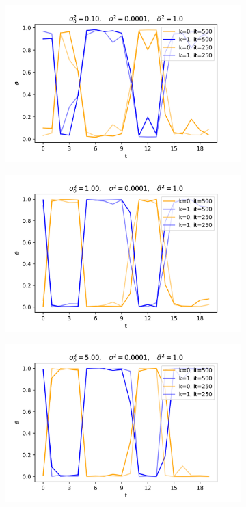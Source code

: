 \documentclass[12pt]{article}
\begin{document}
\begin{figure}[H]
  \begin{subfigure}[b]{0.33\textwidth}
    \includegraphics[width=\linewidth]{init_1E-01|basic_1E-04|prop_1E+00|it_500}
  \end{subfigure}%
  \begin{subfigure}[b]{0.33\textwidth}
    \includegraphics[width=\linewidth]{init_1E+00|basic_1E-04|prop_1E+00|it_500}
  \end{subfigure}%
  \begin{subfigure}[b]{0.33\textwidth}
    \includegraphics[width=\linewidth]{init_5E+00|basic_1E-04|prop_1E+00|it_500}

\end{subfigure}
\end{figure}
\end{document}

